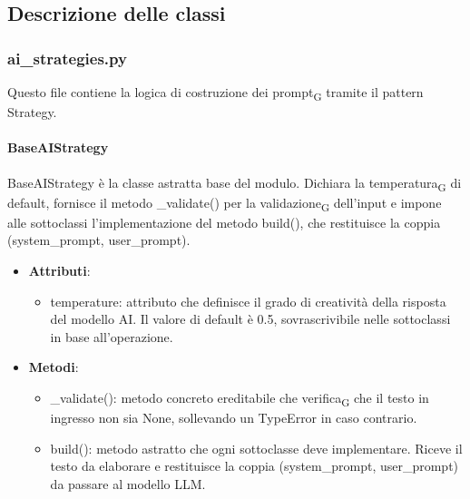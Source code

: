 \documentclass[11pt,a4paper]{article}
\newcommand{\gls}[1]{#1\textsubscript{G}}
\begin{document}
\subsection{Descrizione delle classi}

\subsubsection{ai\_strategies.py}
Questo file contiene la logica di costruzione dei \gls{prompt} tramite il pattern Strategy.

\paragraph{BaseAIStrategy} 
BaseAIStrategy è la classe astratta base del modulo. Dichiara la \gls{temperatura} di default, fornisce il metodo \_validate() per la \gls{validazione} dell'input e impone alle sottoclassi l'implementazione del metodo build(), che restituisce la coppia (system\_prompt, user\_prompt).
\begin{itemize}

\item \textbf{Attributi}:

\begin{itemize}
\item temperature: attributo che definisce il grado di creatività della risposta del modello AI. Il valore di default è 0.5, sovrascrivibile nelle sottoclassi in base all'operazione.
\end{itemize}

\item \textbf{Metodi}: 

\begin{itemize}
\item \_validate(): metodo concreto ereditabile che \gls{verifica} che il testo in ingresso non sia None, sollevando un TypeError in caso contrario.
\item build(): metodo astratto che ogni sottoclasse deve implementare. Riceve il testo da elaborare e restituisce la coppia (system\_prompt, user\_prompt) da passare al modello LLM.
\end{itemize}


\end{itemize}
\end{document}

